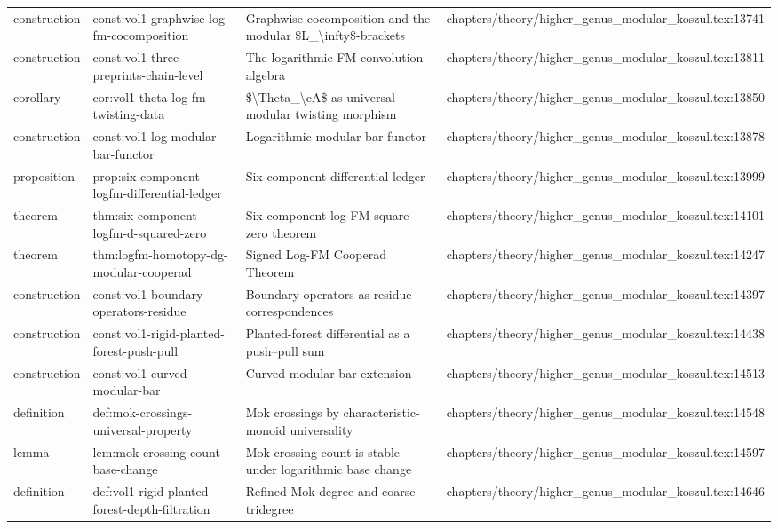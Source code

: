 \documentclass[11pt]{article}
\begin{document}
\begin{longtable}{L{0.10\textwidth}L{0.26\textwidth}L{0.42\textwidth}L{0.22\textwidth}}
construction & const:vol1-graphwise-log-fm-cocomposition & Graphwise cocomposition and the modular \$L\_\textbackslash{}infty\$-brackets & chapters/theory/higher\_genus\_modular\_koszul.tex:13741\\
construction & const:vol1-three-preprints-chain-level & The logarithmic FM convolution algebra & chapters/theory/higher\_genus\_modular\_koszul.tex:13811\\
corollary & cor:vol1-theta-log-fm-twisting-data & \$\textbackslash{}Theta\_\textbackslash{}cA\$ as universal modular twisting morphism & chapters/theory/higher\_genus\_modular\_koszul.tex:13850\\
construction & const:vol1-log-modular-bar-functor & Logarithmic modular bar functor & chapters/theory/higher\_genus\_modular\_koszul.tex:13878\\
proposition & prop:six-component-logfm-differential-led{}ger & Six-component differential led{}ger & chapters/theory/higher\_genus\_modular\_koszul.tex:13999\\
theorem & thm:six-component-logfm-d-squared-zero & Six-component log-FM square-zero theorem & chapters/theory/higher\_genus\_modular\_koszul.tex:14101\\
theorem & thm:logfm-homotopy-dg-modular-cooperad & Signed Log-FM Cooperad Theorem & chapters/theory/higher\_genus\_modular\_koszul.tex:14247\\
construction & const:vol1-boundary-operators-residue & Boundary operators as residue correspondences & chapters/theory/higher\_genus\_modular\_koszul.tex:14397\\
construction & const:vol1-rigid-planted-forest-push-pull & Planted-forest differential as a push--pull sum & chapters/theory/higher\_genus\_modular\_koszul.tex:14438\\
construction & const:vol1-curved-modular-bar & Curved modular bar extension & chapters/theory/higher\_genus\_modular\_koszul.tex:14513\\
definition & def:mok-crossings-universal-property & Mok crossings by characteristic-monoid universality & chapters/theory/higher\_genus\_modular\_koszul.tex:14548\\
lemma & lem:mok-crossing-count-base-change & Mok crossing count is stable under logarithmic base change & chapters/theory/higher\_genus\_modular\_koszul.tex:14597\\
definition & def:vol1-rigid-planted-forest-depth-filtration & Refined Mok degree and coarse tridegree & chapters/theory/higher\_genus\_modular\_koszul.tex:14646\\

\end{longtable}
\end{document}
